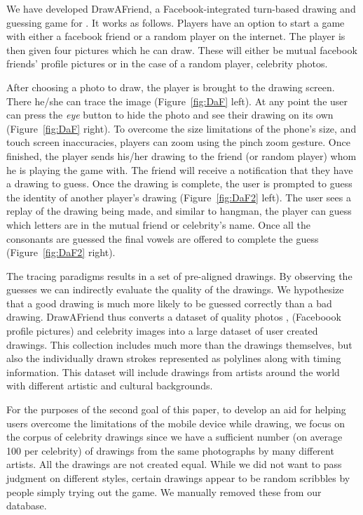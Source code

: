 We have developed DrawAFriend, a Facebook-integrated turn-based drawing and guessing game for .  It works as follows. Players have an option to start a game with either a facebook friend or a random player on the internet. The player is then given four pictures which he can draw. These will either be mutual facebook friends' profile pictures or in the case of a random player, celebrity photos.

After choosing a photo to draw, the player is brought to the drawing screen. There he/she can trace the image (Figure~\ref{fig:DaF} left). At any point the user can press the {\em eye} button to hide the photo and see their drawing on its own (Figure~\ref{fig:DaF} right). To overcome the size limitations of the phone's size, and touch screen inaccuracies, players can zoom using the pinch zoom gesture.
Once finished, the player sends his/her drawing to the friend (or random player) whom he is playing the game with. The friend will receive a notification that they have a drawing to guess. Once the drawing is complete, the user is prompted to guess the identity of another player's drawing (Figure~\ref{fig:DaF2} left). The user sees a replay of the drawing being made, and similar to hangman, the player can guess which letters are in the mutual friend or celebrity's name. Once all the consonants are guessed the final vowels are offered to complete the guess (Figure~\ref{fig:DaF2} right).

The tracing paradigms results in a set of pre-aligned drawings. By observing the guesses we can indirectly evaluate the quality of the drawings. We hypothesize that a good drawing is much more likely to be guessed correctly than a bad drawing. DrawAFriend thus converts a dataset of quality photos , (Faceboook profile pictures) and celebrity images into a large dataset of user created drawings. This collection includes much more than the drawings themselves, but also the individually drawn strokes represented as polylines along with timing information. This dataset will include drawings from artists around the world with different artistic and cultural backgrounds.

For the purposes of the second goal of this paper, to develop an aid for helping users overcome the limitations of the mobile device while drawing, we focus on the corpus of celebrity drawings since we have a sufficient number (on average 100 per celebrity) of drawings from the same photographs by many different artists. All the drawings are not created equal. While we did not want to pass judgment on different styles, certain drawings appear to be random scribbles by people simply trying out the game. We manually removed these from our database. 

